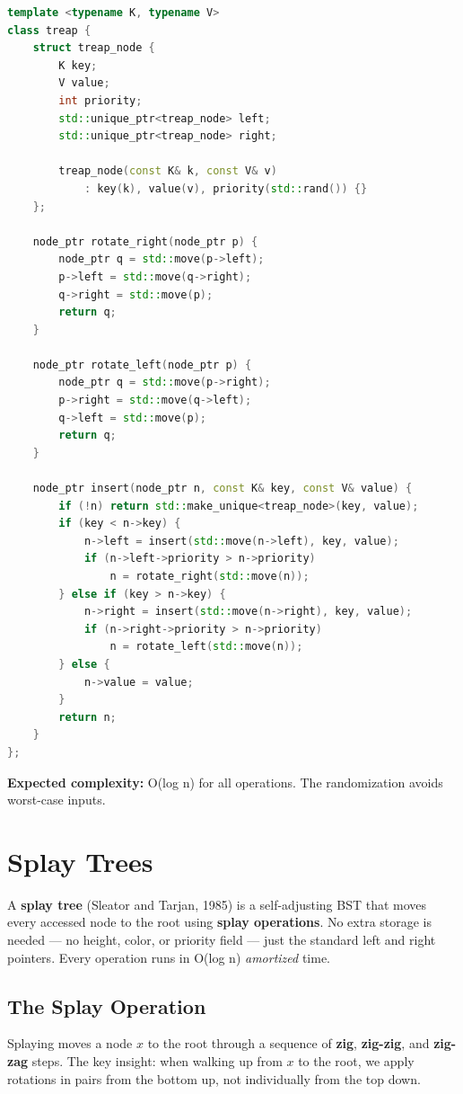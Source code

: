 \begin{lstlisting}[language=C++]
template <typename K, typename V>
class treap {
    struct treap_node {
        K key;
        V value;
        int priority;
        std::unique_ptr<treap_node> left;
        std::unique_ptr<treap_node> right;

        treap_node(const K& k, const V& v)
            : key(k), value(v), priority(std::rand()) {}
    };

    node_ptr rotate_right(node_ptr p) {
        node_ptr q = std::move(p->left);
        p->left = std::move(q->right);
        q->right = std::move(p);
        return q;
    }

    node_ptr rotate_left(node_ptr p) {
        node_ptr q = std::move(p->right);
        p->right = std::move(q->left);
        q->left = std::move(p);
        return q;
    }

    node_ptr insert(node_ptr n, const K& key, const V& value) {
        if (!n) return std::make_unique<treap_node>(key, value);
        if (key < n->key) {
            n->left = insert(std::move(n->left), key, value);
            if (n->left->priority > n->priority)
                n = rotate_right(std::move(n));
        } else if (key > n->key) {
            n->right = insert(std::move(n->right), key, value);
            if (n->right->priority > n->priority)
                n = rotate_left(std::move(n));
        } else {
            n->value = value;
        }
        return n;
    }
};
\end{lstlisting}

\textbf{Expected complexity:} O(log n) for all operations. The randomization avoids worst-case inputs.

\section{Splay Trees}\label{sec:splay}

A \textbf{splay tree} (Sleator and Tarjan, 1985) is a self-adjusting BST that moves every accessed node to the root using \textbf{splay operations}. No extra storage is needed — no height, color, or priority field — just the standard left and right pointers. Every operation runs in O(log n) \textit{amortized} time.

\subsection{The Splay Operation}

Splaying moves a node $x$ to the root through a sequence of \textbf{zig}, \textbf{zig-zig}, and \textbf{zig-zag} steps. The key insight: when walking up from $x$ to the root, we apply rotations in pairs from the bottom up, not individually from the top down.

